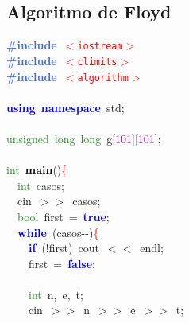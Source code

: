 \documentclass[10pt,a4paper,twoside]{article}
\begin{document}
{{{{{\subsection{Algoritmo de Floyd}
{\ttfamily \raggedright {
\noindent
\mbox{}\textbf{\textcolor{RoyalBlue}{\#include}}\ \texttt{\textcolor{Red}{$<$iostream$>$}} \\
\mbox{}\textbf{\textcolor{RoyalBlue}{\#include}}\ \texttt{\textcolor{Red}{$<$climits$>$}} \\
\mbox{}\textbf{\textcolor{RoyalBlue}{\#include}}\ \texttt{\textcolor{Red}{$<$algorithm$>$}} \\
\mbox{} \\
\mbox{}\textbf{\textcolor{Blue}{using}}\ \textbf{\textcolor{Blue}{namespace}}\ std\textcolor{BrickRed}{;} \\
\mbox{} \\
\mbox{}\textcolor{ForestGreen}{unsigned}\ \textcolor{ForestGreen}{long}\ \textcolor{ForestGreen}{long}\ g\textcolor{BrickRed}{[}\textcolor{Purple}{101}\textcolor{BrickRed}{][}\textcolor{Purple}{101}\textcolor{BrickRed}{];} \\
\mbox{} \\
\mbox{}\textcolor{ForestGreen}{int}\ \textbf{\textcolor{Black}{main}}\textcolor{BrickRed}{()}\textcolor{Red}{\{} \\
\mbox{}\ \ \textcolor{ForestGreen}{int}\ casos\textcolor{BrickRed}{;} \\
\mbox{}\ \ cin\ \textcolor{BrickRed}{$>>$}\ casos\textcolor{BrickRed}{;} \\
\mbox{}\ \ \textcolor{ForestGreen}{bool}\ first\ \textcolor{BrickRed}{=}\ \textbf{\textcolor{Blue}{true}}\textcolor{BrickRed}{;} \\
\mbox{}\ \ \textbf{\textcolor{Blue}{while}}\ \textcolor{BrickRed}{(}casos\textcolor{BrickRed}{-\/-)}\textcolor{Red}{\{} \\
\mbox{}\ \ \ \ \textbf{\textcolor{Blue}{if}}\ \textcolor{BrickRed}{(!}first\textcolor{BrickRed}{)}\ cout\ \textcolor{BrickRed}{$<<$}\ endl\textcolor{BrickRed}{;} \\
\mbox{}\ \ \ \ first\ \textcolor{BrickRed}{=}\ \textbf{\textcolor{Blue}{false}}\textcolor{BrickRed}{;} \\
\mbox{} \\
\mbox{}\ \ \ \ \textcolor{ForestGreen}{int}\ n\textcolor{BrickRed}{,}\ e\textcolor{BrickRed}{,}\ t\textcolor{BrickRed}{;} \\
\mbox{}\ \ \ \ cin\ \textcolor{BrickRed}{$>>$}\ n\ \textcolor{BrickRed}{$>>$}\ e\ \textcolor{BrickRed}{$>>$}\ t\textcolor{BrickRed}{;} \\
}}}}}}}
\end{document}
